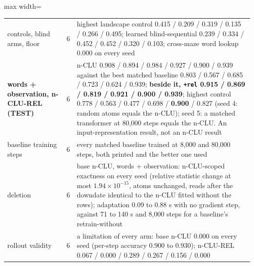 \documentclass{article} %
\newcommand{\sci}[2]{\ensuremath{#1\times10^{#2}}}
\begin{document}
\begin{table}[h]
\begin{adjustbox}{max width=\linewidth}
\begin{tabular}{p{2.2cm}p{0.6cm}p{10.3cm}}
\quad controls, blind arms, floor & 6 & highest landscape control 0.415 / 0.209 / 0.319 / 0.135 / 0.266 / 0.495; learned blind-sequential 0.239 / 0.334 / 0.452 / 0.452 / 0.320 / 0.103; cross-maze word lookup 0.000 on every seed \\
\textbf{words + observation, n-CLU-REL (TEST)} & 6 & n-CLU 0.908 / 0.894 / 0.984 / 0.927 / 0.900 / 0.939 against the best matched baseline 0.803 / 0.567 / 0.685 / 0.723 / 0.624 / 0.939; \textbf{beside it, \texttt{+rel} 0.915 / 0.869 / 0.819 / 0.921 / 0.900 / 0.939}; highest control 0.778 / 0.563 / 0.477 / 0.698 / \textbf{0.900} / 0.827 (seed 4: random atoms equals the n-CLU); seed 5: a matched transformer at 80,000 steps equals the n-CLU. An input-representation result, not an n-CLU result \\
\midrule
baseline training steps & 6 & every matched baseline trained at 8,000 and 80,000 steps, both printed and the better one used \\
deletion & 6 & base n-CLU, words + observation: n-CLU-scoped exactness on every seed (relative statistic change at most \sci{1.94}{-15}, atoms unchanged, reads after the downdate identical to the n-CLU fitted without the rows); adaptation 0.09 to 0.88 s with no gradient step, against 71 to 140 s and 8,000 steps for a baseline's retrain-without \\
rollout validity & 6 & a limitation of every arm: base n-CLU 0.000 on every seed (per-step accuracy 0.900 to 0.930); n-CLU-REL 0.067 / 0.000 / 0.289 / 0.267 / 0.156 / 0.000 \\
\bottomrule
\end{tabular}\end{adjustbox}
\end{table}


\end{document}
